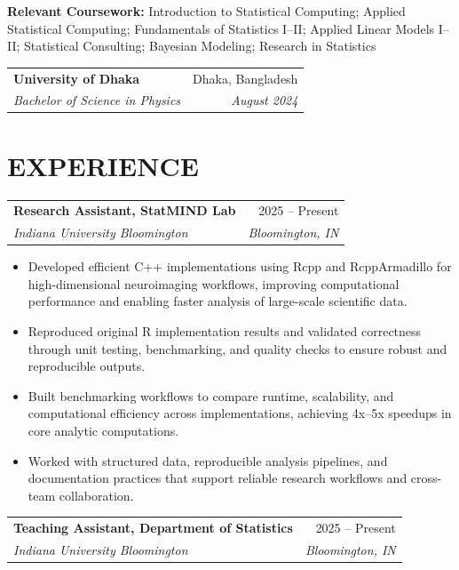\documentclass[10pt,letterpaper]{article}
\makeatletter
\newcommand{\resumeEntry}[4]{%
  \begin{tabularx}{\textwidth}{@{}Xr@{}}
    \textbf{#1} & #2 \\
    \textit{#3} & \textit{#4}
  \end{tabularx}%
}
\newenvironment{resumeItems}{%
  \begin{itemize}[
    label=\textbullet,
    leftmargin=14pt,
    labelsep=5pt,
    itemsep=0.5pt,
    topsep=1.0pt,
    parsep=0pt,
    partopsep=0pt
  ]
}{%
  \end{itemize}
}
\makeatother
\begin{document}
\vspace{0.5pt}

\textbf{Relevant Coursework:}
Introduction to Statistical Computing; Applied Statistical Computing; Fundamentals of Statistics I--II; Applied Linear Models I--II; Statistical Consulting; Bayesian Modeling; Research in Statistics

\vspace{2.2pt}

\resumeEntry
  {University of Dhaka}
  {Dhaka, Bangladesh}
  {Bachelor of Science in Physics}
  {August 2024}

\section*{EXPERIENCE}

\resumeEntry
  {Research Assistant, StatMIND Lab}
  {2025 -- Present}
  {Indiana University Bloomington}
  {Bloomington, IN}

\begin{resumeItems}
  \item Developed efficient C++ implementations using Rcpp and RcppArmadillo for high-dimensional neuroimaging workflows, improving computational performance and enabling faster analysis of large-scale scientific data.

  \item Reproduced original R implementation results and validated correctness through unit testing, benchmarking, and quality checks to ensure robust and reproducible outputs.

  \item Built benchmarking workflows to compare runtime, scalability, and computational efficiency across implementations, achieving 4x--5x speedups in core analytic computations.

  \item Worked with structured data, reproducible analysis pipelines, and documentation practices that support reliable research workflows and cross-team collaboration.
\end{resumeItems}

\vspace{1.3pt}

\resumeEntry
  {Teaching Assistant, Department of Statistics}
  {2025 -- Present}
  {Indiana University Bloomington}
  {Bloomington, IN}
\end{document}
